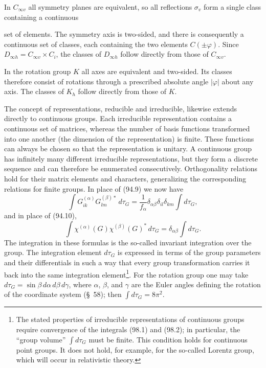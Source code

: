 In $C_{\infty v}$ all symmetry planes are equivalent, so all reflections $\sigma_v$ form a single class containing a continuous

set of elements. The symmetry axis is two-sided, and there is consequently a continuous set of classes, each containing the two elements $C(\pm\varphi)$. Since $D_{\infty h}=C_{\infty v}\times C_i$, the classes of $D_{\infty h}$ follow directly from those of $C_{\infty v}$.

In the rotation group $K$ all axes are equivalent and two-sided. Its classes therefore consist of rotations through a prescribed absolute angle $|\varphi|$ about any axis. The classes of $K_h$ follow directly from those of $K$.

The concept of representations, reducible and irreducible, likewise extends directly to continuous groups. Each irreducible representation contains a continuous set of matrices, whereas the number of basis functions transformed into one another (the dimension of the representation) is finite. These functions can always be chosen so that the representation is unitary. A continuous group has infinitely many different irreducible representations, but they form a discrete sequence and can therefore be enumerated consecutively. Orthogonality relations hold for their matrix elements and characters, generalizing the corresponding relations for finite groups. In place of (94.9) we now have
\begin{equation}
 \int G_{ik}^{(\alpha)}G_{lm}^{(\beta)*}\,d\tau_G
 =\frac1{f_\alpha}\delta_{\alpha\beta}\delta_{il}\delta_{km}\int d\tau_G,
 \tag{98.1}
\end{equation}
and in place of (94.10),
\begin{equation}
 \int\chi^{(\alpha)}(G)\chi^{(\beta)}(G)^*\,d\tau_G
 =\delta_{\alpha\beta}\int d\tau_G.
 \tag{98.2}
\end{equation}
The integration in these formulas is the so-called invariant integration over the group. The integration element $d\tau_G$ is expressed in terms of the group parameters and their differentials in such a way that every group transformation carries it back into the same integration element\footnote{The stated properties of irreducible representations of continuous groups require convergence of the integrals (98.1) and (98.2); in particular, the ``group volume'' $\int d\tau_G$ must be finite. This condition holds for continuous point groups. It does not hold, for example, for the so-called Lorentz group, which will occur in relativistic theory.}. For the rotation group one may take $d\tau_G=\sin\beta\,d\alpha\,d\beta\,d\gamma$, where $\alpha$, $\beta$, and $\gamma$ are the Euler angles defining the rotation of the coordinate system (\S~58); then $\int d\tau_G=8\pi^2$.

